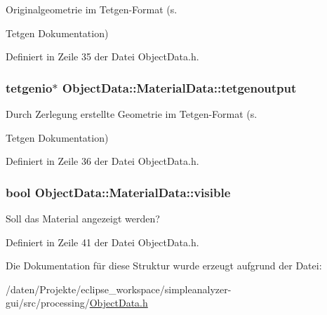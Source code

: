 Originalgeometrie im Tetgen-\/\-Format (s. 

Tetgen Dokumentation) 

Definiert in Zeile 35 der Datei Object\-Data.\-h.

\hypertarget{structObjectData_1_1MaterialData_a15d576cfe25abe334e34eb5e4671d6d7}{
\subsubsection[{tetgenoutput}]{\setlength{\rightskip}{0pt plus 5cm}tetgenio$\ast$ Object\-Data\-::\-Material\-Data\-::tetgenoutput}}\label{structObjectData_1_1MaterialData_a15d576cfe25abe334e34eb5e4671d6d7}


Durch Zerlegung erstellte Geometrie im Tetgen-\/\-Format (s. 

Tetgen Dokumentation) 

Definiert in Zeile 36 der Datei Object\-Data.\-h.

\hypertarget{structObjectData_1_1MaterialData_a37980da11f6b51b30eb41c3ab4e9674a}{
\subsubsection[{visible}]{\setlength{\rightskip}{0pt plus 5cm}bool Object\-Data\-::\-Material\-Data\-::visible}}\label{structObjectData_1_1MaterialData_a37980da11f6b51b30eb41c3ab4e9674a}


Soll das Material angezeigt werden? 



Definiert in Zeile 41 der Datei Object\-Data.\-h.



Die Dokumentation für diese Struktur wurde erzeugt aufgrund der Datei\-:\begin{DoxyCompactItemize}
\item 
/daten/\-Projekte/eclipse\-\_\-workspace/simpleanalyzer-\/gui/src/processing/\hyperlink{ObjectData_8h}{Object\-Data.\-h}\end{DoxyCompactItemize}
